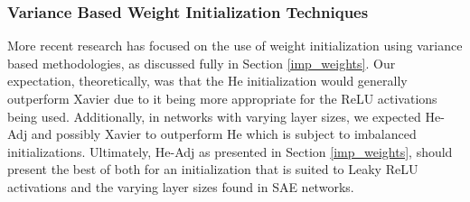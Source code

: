 \documentclass[a4paper,11pt,oneside]{article}
\theoremstyle{plain}
\theoremstyle{definition}
\begin{document}
	\subsubsection{Variance Based Weight Initialization Techniques}
	
	More recent research has focused on the use of weight initialization using variance based methodologies, as discussed fully in Section \ref{imp_weights}. Our expectation, theoretically, was that the He initialization would generally outperform Xavier due to it being more appropriate for the ReLU activations being used. Additionally, in networks with varying layer sizes, we expected He-Adj and possibly Xavier to outperform He which is subject to imbalanced initializations. Ultimately, He-Adj as presented in Section \ref{imp_weights}, should present the best of both for an initialization that is suited to Leaky ReLU activations and the varying layer sizes found in SAE networks.\newline
	
\end{document}
